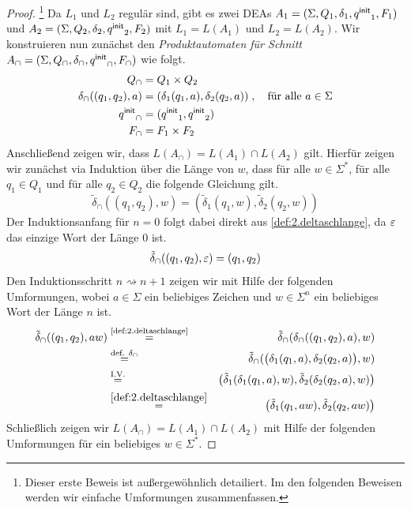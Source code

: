 
\begin{proof}\footnote{Dieser erste Beweis ist außergewöhnlich detailiert. Im den folgenden Beweisen werden wir einfache Umformungen zusammenfassen.}
Da $L_1$ und $L_2$ regulär sind, gibt es zwei \ac{DEA}s $A_1=(\Sigma, Q_1,\delta_1,{q^\mathsf{init}}_1,F_1)$ und $A_2=(\Sigma, Q_2,\delta_2,{q^\mathsf{init}}_2,F_2)$ mit $L_1=L(A_1)$ und $L_2=L(A_2)$.
Wir konstruieren nun zunächst den \emph{Produktautomaten für Schnitt} $A_\cap=(\Sigma, Q_\cap,\delta_\cap,{q^\mathsf{init}}_\cap,F_\cap)$ wie folgt.
		\begin{align*}
			Q_\cap &= Q_1\times Q_2\\
			\delta_\cap((q_1,q_2),a) &= (\delta_1(q_1,a),\delta_2(q_2,a))\;, \quad \text{für alle } a\in\Sigma\\
			{q^\mathsf{init}}_\cap &= ({q^\mathsf{init}}_1,{q^\mathsf{init}}_2)\\
			F_\cap &= F_1\times F_2\\
		\end{align*}
Anschließend zeigen wir, dass $L(A_\cap)=L(A_1)\cap L(A_2)$ gilt. 
Hierfür zeigen wir zunächst via Induktion über die Länge von $w$, dass für alle $w\in\Sigma^*$, für alle $q_1\in Q_1$ und für alle $q_2\in Q_2$ die folgende Gleichung gilt.
$$\tilde{\delta}_\cap((q_1,q_2),w) = (\tilde{\delta}_1(q_1,w), \tilde{\delta}_2(q_2,w))$$
Der Induktionsanfang für $n=0$ folgt dabei direkt aus \autoref{def:2.deltaschlange}, da $\varepsilon$ das einzige Wort der Länge $0$ ist.
$$\tilde{\delta}_\cap((q_1,q_2),\varepsilon) = (q_1,q_2)$$
Den Induktionsschritt $n\rightsquigarrow n+1$ zeigen wir mit Hilfe der folgenden Umformungen, wobei $a\in\Sigma$ ein beliebiges Zeichen und $w\in\Sigma^n$ ein beliebiges Wort der Länge $n$ ist.
\begin{eqnarray*}
  \tilde{\delta}_\cap((q_1,q_2),aw) 
    & \stackrel{\text{\autoref{def:2.deltaschlange}}}{=} & \tilde{\delta}_\cap(\delta_\cap((q_1,q_2),a),w)\\
    & \stackrel{\text{def. }\delta_\cap}{=} & \tilde{\delta}_\cap (\big(\delta_1(q_1,a),\delta_2(q_2,a)\big),w)\\
    & \stackrel{\text{I.V.}}{=} & \big(\tilde{\delta}_1 (\delta_1(q_1,a),w), \tilde{\delta}_2(\delta_2(q_2,a),w)\big)\\
    & \stackrel{\autoref{def:2.deltaschlange}}{=} & \big(\tilde{\delta}_1(q_1,aw), \tilde{\delta}_2(q_2,aw)\big)
\end{eqnarray*}
Schließlich zeigen wir $L(A_\cap)=L(A_1)\cap L(A_2)$ mit Hilfe der folgenden Umformungen für ein beliebiges $w\in\Sigma^*$.

\end{proof}

